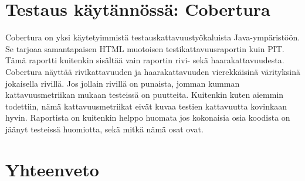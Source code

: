 \documentclass{tktltiki}
\begin{document}

\section{Testaus käytännössä: Cobertura}
Cobertura on yksi käytetyimmistä testauskattavuustyökaluista Java-ympäristöön. Se tarjoaa samantapaisen HTML muotoisen testikattavuusraportin kuin PIT. Tämä raportti kuitenkin sisältää vain raportin rivi- sekä haarakattavuudesta. Cobertura näyttää rivikattavuuden ja haarakattavuuden vierekkäisinä värityksinä jokaisella rivillä. Jos jollain rivillä on punaista, jomman kumman kattavuusmetriikan mukaan testeissä on puutteita. Kuitenkin kuten aiemmin todettiin, nämä kattavuusmetriikat eivät kuvaa testien kattavuutta kovinkaan hyvin. Raportista on kuitenkin helppo huomata jos kokonaisia osia koodista on jäänyt testeissä huomiotta, sekä mitkä nämä osat ovat. 

\section{Yhteenveto}

{}

\end{document}
